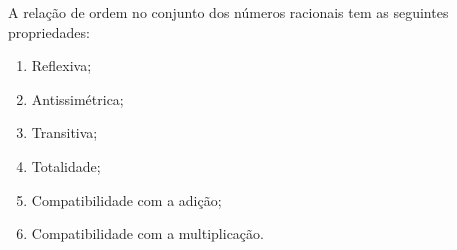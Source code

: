 \documentclass[../main.tex]{subfiles}
\begin{document}


\begin{prop}\label{rac-prop-relOrdem}
    A relação de ordem no conjunto dos números racionais tem as seguintes propriedades:
    \begin{enumerate}[label=(\roman*)]
        \item Reflexiva;
        \item Antissimétrica;
        \item Transitiva;
        \item Totalidade;
        \item Compatibilidade com a adição;
        \item Compatibilidade com a multiplicação.
    \end{enumerate}
\end{prop}
\end{document}
